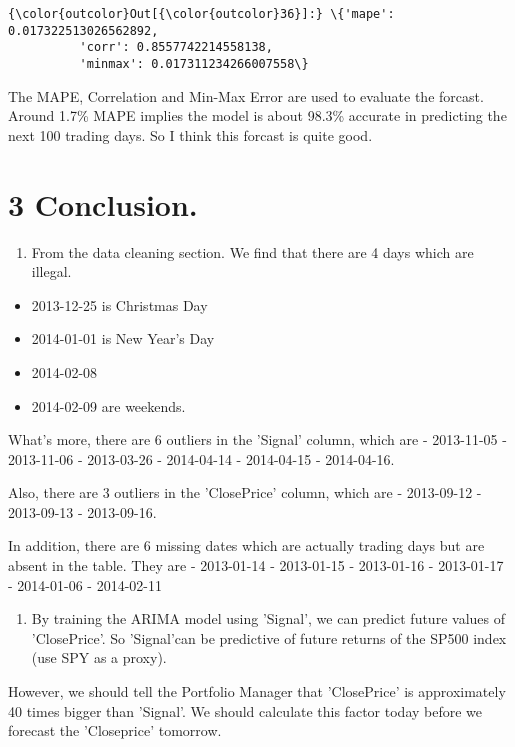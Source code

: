\documentclass[11pt]{article}
\providecommand{\tightlist}{%
      \setlength{\itemsep}{0pt}\setlength{\parskip}{0pt}}
\begin{document}
\begin{Verbatim}[commandchars=\\\{\}]
{\color{outcolor}Out[{\color{outcolor}36}]:} \{'mape': 0.017322513026562892,
          'corr': 0.8557742214558138,
          'minmax': 0.017311234266007558\}
\end{Verbatim}
            
    The MAPE, Correlation and Min-Max Error are used to evaluate the
forcast. Around 1.7\% MAPE implies the model is about 98.3\% accurate in
predicting the next 100 trading days. So I think this forcast is quite
good.

    \section{3 Conclusion.}\label{conclusion.}

    \begin{enumerate}
\def\labelenumi{(\arabic{enumi})}
\tightlist
\item
  From the data cleaning section. We find that there are 4 days which
  are illegal.
\end{enumerate}

\begin{itemize}
\tightlist
\item
  2013-12-25 is Christmas Day
\item
  2014-01-01 is New Year's Day
\item
  2014-02-08
\item
  2014-02-09 are weekends.
\end{itemize}

What's more, there are 6 outliers in the 'Signal' column, which are -
2013-11-05 - 2013-11-06 - 2013-03-26 - 2014-04-14 - 2014-04-15 -
2014-04-16.

Also, there are 3 outliers in the 'ClosePrice' column, which are -
2013-09-12 - 2013-09-13 - 2013-09-16.

In addition, there are 6 missing dates which are actually trading days
but are absent in the table. They are - 2013-01-14 - 2013-01-15 -
2013-01-16 - 2013-01-17 - 2014-01-06 - 2014-02-11

    \begin{enumerate}
\def\labelenumi{(\arabic{enumi})}
\setcounter{enumi}{1}
\tightlist
\item
  By training the ARIMA model using 'Signal', we can predict future
  values of 'ClosePrice'. So 'Signal'can be predictive of future returns
  of the SP500 index (use SPY as a proxy).
\end{enumerate}

However, we should tell the Portfolio Manager that 'ClosePrice' is
approximately 40 times bigger than 'Signal'. We should calculate this
factor today before we forecast the 'Closeprice' tomorrow.


    
    
    
    
\end{document}
